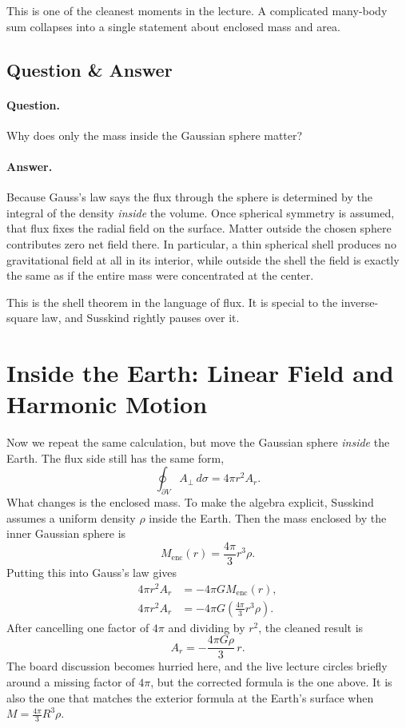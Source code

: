 This is one of the cleanest moments in the lecture. A complicated many-body sum collapses into a single statement about enclosed mass and area.

\subsection{Question \& Answer}

\paragraph{Question.} Why does only the mass inside the Gaussian sphere matter?

\paragraph{Answer.} Because Gauss's law says the flux through the sphere is determined by the integral of the density \emph{inside} the volume. Once spherical symmetry is assumed, that flux fixes the radial field on the surface. Matter outside the chosen sphere contributes zero net field there. In particular, a thin spherical shell produces no gravitational field at all in its interior, while outside the shell the field is exactly the same as if the entire mass were concentrated at the center.

This is the shell theorem in the language of flux. It is special to the inverse-square law, and Susskind rightly pauses over it.

\section{Inside the Earth: Linear Field and Harmonic Motion}

Now we repeat the same calculation, but move the Gaussian sphere \emph{inside} the Earth. The flux side still has the same form,
\begin{equation}
\oint_{\partial V} A_\perp\,d\sigma = 4\pi r^2 A_r.
\end{equation}
What changes is the enclosed mass. To make the algebra explicit, Susskind assumes a uniform density $\rho$ inside the Earth. Then the mass enclosed by the inner Gaussian sphere is
\begin{equation}
M_{\mathrm{enc}}(r)=\frac{4\pi}{3}r^3\rho.
\end{equation}
Putting this into Gauss's law gives
\begin{align}
4\pi r^2 A_r
&=
-4\pi G M_{\mathrm{enc}}(r),\\
4\pi r^2 A_r
&=
-4\pi G\left(\frac{4\pi}{3}r^3\rho\right).
\end{align}
After cancelling one factor of $4\pi$ and dividing by $r^2$, the cleaned result is
\begin{equation}
A_r = -\frac{4\pi G\rho}{3}\,r.
\end{equation}
The board discussion becomes hurried here, and the live lecture circles briefly around a missing factor of $4\pi$, but the corrected formula is the one above. It is also the one that matches the exterior formula at the Earth's surface when $M=\frac{4\pi}{3}R^3\rho$.

